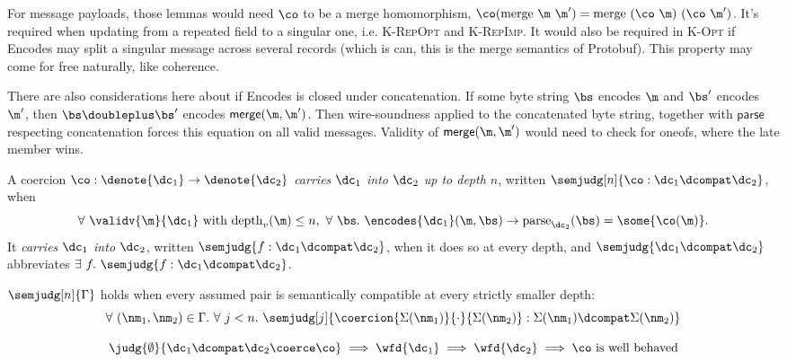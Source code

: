 For message payloads, those lemmas would need $\co$ to be a merge homomorphism,
$\co(\mathrm{merge}\ \m\ \m') = \mathrm{merge}\ (\co\ \m)\ (\co\ \m')$. It's required when
updating from a repeated field to a singular one, i.e. \textsc{K-RepOpt} and
\textsc{K-RepImp}. It would also be required in \textsc{K-Opt} if Encodes may
split a singular message across several records (which is can, this is the merge
semantics of Protobuf). This property may come for free naturally, like
coherence.

There are also considerations here about if Encodes is closed under
concatenation. If some byte string $\bs$ encodes $\m$ and $\bs'$ encodes $\m'$, then
$\bs \doubleplus \bs'$ encodes $\mathsf{merge}(\m, \m')$. Then wire-soundness
applied to the concatenated byte string, together with $\mathsf{parse}$
respecting concatenation forces this equation on all valid messages. Validity of
$\mathsf{merge}(\m, \m')$ would need to check for oneofs, where the late member
wins.

\vspace{1em}
\begin{definition}\label{def:sem-compat}
  A coercion $\co : \denote{\dc_1} \rightarrow \denote{\dc_2}$ \emph{carries $\dc_1$ into
  $\dc_2$ up to depth $n$}, written $\semjudg[n]{\co : \dc_1 \dcompat \dc_2}$, when
  \[ \forall\ \validv{\m}{\dc_1} \text{ with } \mathrm{depth}_v(\m) \le n,\
    \forall\ \bs.\ \encodes{\dc_1}(\m, \bs) \rightarrow
    \mathrm{parse}_{\dc_2}(\bs) = \some{\co(\m)}. \]
  It \emph{carries $\dc_1$ into $\dc_2$}, written $\semjudg{f : \dc_1 \dcompat \dc_2}$, when
  it does so at every depth, and $\semjudg{\dc_1 \dcompat \dc_2}$ abbreviates
  $\exists\ f.\ \semjudg{f : \dc_1 \dcompat \dc_2}$.
\end{definition}

\vspace{1em}
\begin{definition}\label{def:sem-assum}
  $\semjudg[n]{\Gamma}$ holds when every assumed pair is semantically compatible at every
  strictly smaller depth:
  \[ \forall\ (\nm_1, \nm_2) \in \Gamma.\ \forall\ j < n.\ \semjudg[j]{ \coercion{\Sigma(\nm_1)}{\cdot}{\Sigma(\nm_2)} :
      \Sigma(\nm_1) \dcompat \Sigma(\nm_2)} \]
\end{definition}

\vspace{1em}
\begin{definition}[Soundness]\label{def:soundness}
  \[ \judg{\emptyset}{\dc_1 \dcompat \dc_2 \coerce \co} \implies \wfd{\dc_1} \implies \wfd{\dc_2}
    \implies \co \text{ is well behaved} \]
\end{definition} %


